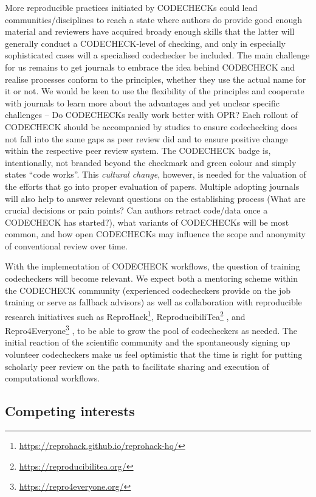 \documentclass[12pt]{article}
\begin{document}
More reproducible practices initiated by CODECHECKs could lead
communities/disciplines to reach a state where authors do provide good
enough material and reviewers have acquired broady enough skills that
the latter will generally conduct a CODECHECK-level of checking, and
only in especially sophisticated cases will a specialised codechecker
be included.
The main challenge for us remains to get journals to embrace the
idea behind CODECHECK and realise processes conform to the principles,
whether they use the actual name for it or not.
We would be keen to use the flexibility of the principles and cooperate
with journals to learn more about the advantages and yet unclear
specific challenges -- Do CODECHECKs really work better with OPR?
Each rollout of CODECHECK should be accompanied by studies to ensure 
codechecking does not fall into the same gaps as peer review did
\cite{tennant_limitations_2020}
and to ensure positive change within the respective peer review system.
The CODECHECK badge is, intentionally, not branded beyond the checkmark
and green colour and simply states ``code works''.
This \emph{cultural change}, however, is needed for the valuation of the
efforts that go into proper evaluation of papers.
Multiple adopting journals will also help to answer relevant questions on
the establishing process (What are crucial decisions or pain points? Can
authors retract code/data once a CODECHECK has started?),
what variants of CODECHECKs will be most common, and how open CODECHECKs
may influence the scope and anonymity of conventional review over time.

With the implementation of CODECHECK workflows, the question of training
codecheckers will become relevant. We expect both a mentoring scheme within
the CODECHECK community (experienced codecheckers provide on the job training
or serve as fallback advisors) as well as collaboration with reproducible
research initiatives such as
ReproHack\footnote{\url{https://reprohack.github.io/reprohack-hq/}},
ReproducibiliTea\footnote{\url{https://reproducibilitea.org/}}
\cite{fitzgibbon_brewing_2020},
and Repro4Everyone\footnote{\url{https://repro4everyone.org/}}
\cite{auer_reproducibility_2020},
to be able to grow the pool of codecheckers as needed.
The initial reaction of the scientific community and the spontaneously signing
up volunteer codecheckers make us feel optimistic that the time is right for 
putting scholarly peer review on the path to facilitate sharing and execution
of computational workflows.

\subsection*{Competing interests}
\end{document}
